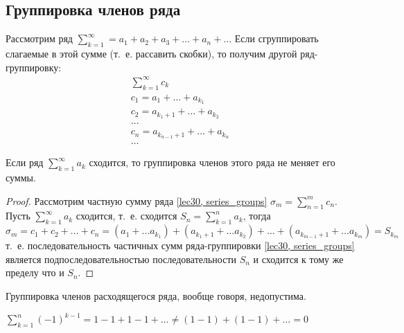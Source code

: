 \documentclass[../../main.tex]{subfiles}
\begin{document}
\subsection{Группировка членов ряда}
Рассмотрим ряд
$\sum\limits_{k = 1}^{\infty} = a_1 + a_2 + a_3 + \ldots + a_n + \ldots$
Если сгруппировать слагаемые в этой сумме (т.~е. рассавить скобки), то получим
другой ряд-группировку:
\begin{equation}
\begin{gathered}
	\label{lec30, series_groups}
	\sum\limits_{k = 1}^{\infty} c_k \\
	c_1 = a_1 + \ldots + a_{k_1} \\
	c_2 = a_{k_1+1} + \ldots + a_{k_2} \\
	\ldots \\
	c_n = a_{k_{n-1}+1} + \ldots + a_{k_n} \\
	\ldots
\end{gathered}
\end{equation}
\begin{thm}
	Если ряд $\sum\limits_{k = 1}^{\infty} a_k$ сходится,
	то группировка членов этого ряда не меняет его суммы.
\end{thm}
\begin{proof}
Рассмотрим частную сумму ряда \eqref{lec30, series_groups}
$\sigma_m = \sum\limits_{n = 1}^{m} c_n$.
Пусть $\sum\limits_{k = 1}^{\infty} a_k$ сходится, т.~е. сходится
$ S_n = \sum\limits_{k = 1}^{n} a_k$, тогда
\[\sigma_m = c_1 + c_2 + \ldots + c_n = (a_1 + \ldots a_{k_1}) +
(a_{k_1 + 1} + \ldots a_{k_2}) +
\ldots + (a_{k_{m-1} + 1} + \ldots a_{k_m}) = S_{k_m}\]
т.~е. последовательность частичных сумм ряда-группировки
\eqref{lec30, series_groups} является подпоследовательностью
последовательности $S_n$ и сходится к тому же пределу что и $S_n$.
\end{proof}
Группировка членов расходящегося ряда, вообще говоря, недопустима.
\begin{example}
	$\sum\limits_{k = 1}^{n} (-1)^{k - 1} = 1 - 1 + 1 - 1  + \ldots \neq
	(1 - 1) + (1 - 1) + \ldots = 0$
\end{example}
\end{document}
